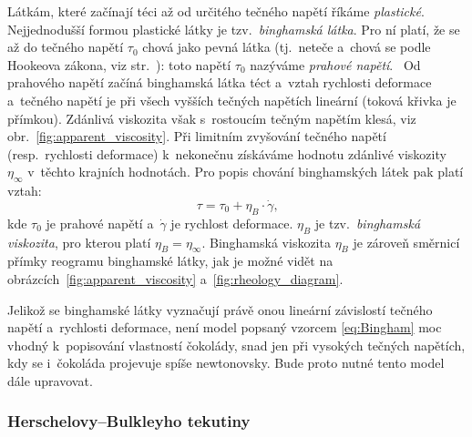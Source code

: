 \documentclass[12pt]{article}
\begin{document}
Látkám, které začínají téci až od určitého tečného napětí říkáme \emph{plastické}.~\cite{material:Nenewtonovské_kapaliny}\cite{material:Viskozita_a_povrchove_napeti} Nejjednodušší formou plastické látky je tzv.~\emph{binghamská látka}. Pro ní platí, že se až do tečného napětí $\tau_0$ chová jako pevná látka (tj.~neteče a~chová se podle Hookeova zákona, viz str.~\pageref{sec:Hookeův_zákon}): toto napětí $\tau_0$ nazýváme \emph{prahové napětí}.~\cite{wiki:Bingham_plastic}\cite{material:Tokove_chovani_reologicke_modely} Od prahového napětí začíná binghamská látka téct a~vztah rychlosti deformace a~tečného napětí je při všech vyšších tečných napětích lineární (toková křivka je přímkou). Zdánlivá viskozita však s~rostoucím tečným napětím klesá, viz obr.~\ref{fig:apparent_viscosity}. Při limitním zvyšování tečného napětí (resp.~rychlosti deformace) k~nekonečnu získáváme hodnotu zdánlivé viskozity $\eta_\infty$ v~těchto krajních hodnotách. Pro popis chování binghamských látek pak platí vztah:~\cite{Article:Comparison_of_models_chocolate}\cite{Article:Extended_casson_equation}
\begin{equation}
    \tau = \tau_0 + \eta_B\cdot \dot\gamma\text{,}
    \label{eq:Bingham}
\end{equation}
kde $\tau_0$ je prahové napětí a~$\dot\gamma$ je rychlost deformace. $\eta_B$ je tzv.~\emph{binghamská viskozita}, pro kterou platí $\eta_B = \eta_\infty$. Binghamská viskozita $\eta_B$ je zároveň směrnicí přímky reogramu binghamské látky, jak je možné vidět na obrázcích~\ref{fig:apparent_viscosity} a~\ref{fig:rheology_diagram}.
\par\noindent
Jelikož se binghamské látky vyznačují právě onou lineární závislostí tečného napětí a~rychlosti deformace, není model popsaný vzorcem \ref{eq:Bingham} moc vhodný k~popisování vlastností čokolády, snad jen při vysokých tečných napětích, kdy se i~čokoláda projevuje spíše newtonovsky. Bude proto nutné tento model dále upravovat.

\subsubsection{Herschelovy–Bulkleyho tekutiny}%
\end{document}
